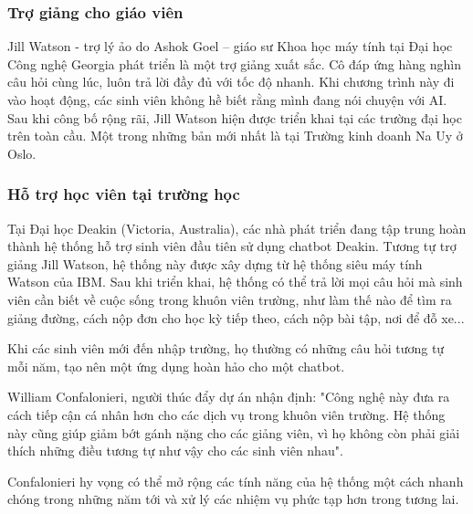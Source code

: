 \subsubsection{Trợ giảng cho giáo viên}
Jill Watson - trợ lý ảo do Ashok Goel\cite{goel2016jill} – giáo sư Khoa học máy tính tại Đại học Công nghệ Georgia phát triển là một trợ giảng xuất sắc. Cô đáp ứng hàng nghìn câu hỏi cùng lúc, luôn trả lời đầy đủ với tốc độ nhanh. Khi chương trình này đi vào hoạt động, các sinh viên không hề biết rằng mình đang nói chuyện với AI. Sau khi công bố rộng rãi, Jill Watson hiện được triển khai tại các trường đại học trên toàn cầu. Một trong những bản mới nhất là tại Trường kinh doanh Na Uy ở Oslo.\par

\subsubsection{Hỗ trợ học viên tại trường học}
Tại Đại học Deakin (Victoria, Australia), các nhà phát triển đang tập trung hoàn thành hệ thống hỗ trợ sinh viên đầu tiên sử dụng chatbot Deakin. Tương tự trợ giảng Jill Watson\cite{goel2018jill}, hệ thống này được xây dựng từ hệ thống siêu máy tính Watson của IBM. Sau khi triển khai, hệ thống có thể trả lời mọi câu hỏi mà sinh viên cần biết về cuộc sống trong khuôn viên trường, như làm thế nào để tìm ra giảng đường, cách nộp đơn cho học kỳ tiếp theo, cách nộp bài tập, nơi để đỗ xe...\par
Khi các sinh viên mới đến nhập trường, họ thường có những câu hỏi tương tự mỗi năm, tạo nên một ứng dụng hoàn hảo cho một chatbot.\par
William Confalonieri, người thúc đẩy dự án nhận định: "Công nghệ này đưa ra cách tiếp cận cá nhân hơn cho các dịch vụ trong khuôn viên trường. Hệ thống này cũng giúp giảm bớt gánh nặng cho các giảng viên, vì họ không còn phải giải thích những điều tương tự như vậy cho các sinh viên nhau".\par
Confalonieri hy vọng có thể mở rộng các tính năng của hệ thống một cách nhanh chóng trong những năm tới và xử lý các nhiệm vụ phức tạp hơn trong tương lai.\par

